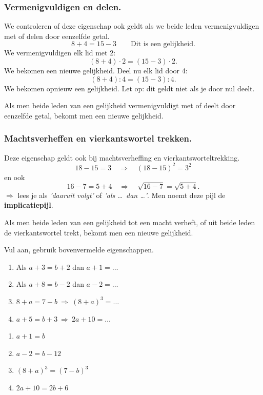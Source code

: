\documentclass{bis}
\begin{document}
\subsubsection*{Vermenigvuldigen en delen.}
We controleren of deze eigenschap ook geldt als we beide leden vermenigvuldigen met of delen
door eenzelfde getal.
\[8+4=15-3\qquad\text{Dit is een gelijkheid.}\]
We vermenigvuldigen elk lid met 2:
\[(8+4)\cdot2=(15-3)\cdot2.\]
We bekomen een nieuwe gelijkheid. Deel nu elk lid door 4:
\[(8+4):4=(15-3):4.\]
We bekomen opnieuw een gelijkheid. Let op: dit geldt niet als je door nul deelt.
\begin{onthoud}
Als men beide leden van een gelijkheid vermenigvuldigt met of deelt door eenzelfde getal,
bekomt men een nieuwe gelijkheid.
\end{onthoud}

\subsubsection*{Machtsverheffen en vierkantswortel trekken.}
Deze eigenschap geldt ook bij machtsverheffing en vierkantsworteltrekking.
\[18-15=3\quad\Rightarrow\quad(18-15)^2=3^2\]
en ook
\[16-7=5+4\quad\Rightarrow\quad\sqrt{16-7}=\sqrt{5+4}.\]
$\Rightarrow$ lees je als \emph{'daaruit volgt'} of \emph{'als \dots\ dan \dots'}. Men noemt deze
pijl de \textbf{implicatiepijl}.
\begin{onthoud}
Als men beide leden van een gelijkheid tot een macht verheft, of uit beide leden de
vierkantswortel trekt, bekomt men een nieuwe gelijkheid.
\end{onthoud}

\begin{exercise}
Vul aan, gebruik bovenvermelde eigenschappen.
\begin{enumerate}
  \item Als $a+3=b+2$ dan $a+1=\ldots$
  \item Als $a+8=b-2$ dan $a-2=\ldots$
  \item $8+a=7-b\ \Rightarrow\ (8+a)^3=\ldots$
  \item $a+5=b+3\ \Rightarrow\ 2a+10=\ldots$
\end{enumerate}
\end{exercise}

\begin{solution}
\begin{enumerate}
  \item $a+1=b$
  \item $a-2=b-12$
  \item $(8+a)^3=(7-b)^3$
  \item $2a+10=2b+6$
\end{enumerate}
\end{solution}
\end{document}
